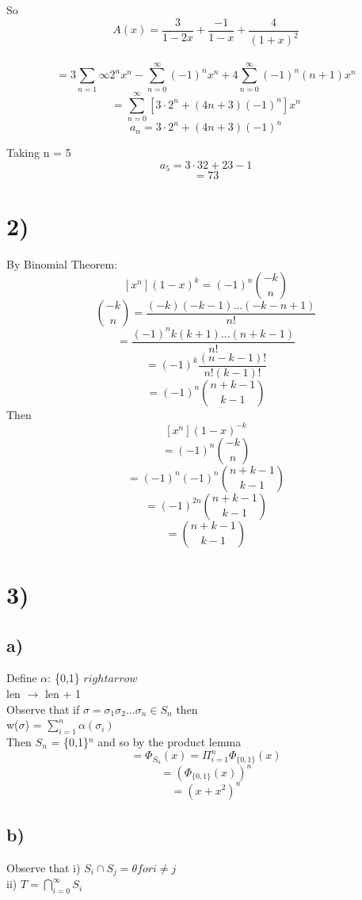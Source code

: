 \documentclass[12pt]{article}
\begin{document}
	So
	$$A(x) = \frac{3}{1-2x} + \frac{-1}{1-x} + \frac{4}{(1+x)^2}$$\\
	$$= 3 \sum_{n=1}{\infty}2^nx^n - \sum_{n=0}^{\infty}(-1)^nx^n + 4 \sum_{n=0}^{\infty}(-1)^n(n+1)x^n$$
	$$= \sum_{n=0}^{\infty}[3 \cdot 2^n + (4n+3)(-1)^n]x^n$$
	$$a_n = 3 \cdot 2^n + (4n+3)(-1)^n$$
	
	Taking n = 5\\
	
	$$a_5 = 3 \cdot 32 + 23 - 1$$
	$$ = 73$$
	
	\section*{2)}
	
	By Binomial Theorem:\\
	$$[x^n](1-x)^k = (-1)^n{-k \choose n}$$
	$${-k \choose n} = \frac{(-k)(-k-1)...(-k-n+1)}{n!}$$
	$$= \frac{(-1)^nk(k+1)...(n+k-1)}{n!}$$
	$$= (-1)^k\frac{(n-k-1)!}{n!(k-1)!}$$
	$$= (-1)^n{n+k-1 \choose k-1}$$
	Then
	$$[x^n](1-x)^{-k}$$
	$$= (-1)^n{-k \choose n}$$
	$$= (-1)^n(-1)^n{n+k-1 \choose k-1}$$
	$$= (-1)^{2n}{n+k-1 \choose k-1}$$
	$$= {n+k-1 \choose k-1}$$
	
	\section*{3)}
	
	\subsection*{a)}
	Define $\alpha$: \{0,1\} $rightarrow$\\
	len $\rightarrow$ len + 1\\
	
	Observe that if $\sigma = \sigma_1 \sigma_2 ... \sigma_n \in S_n$ then\\
	w($\sigma$) = $\sum_{i=1}^{n}\alpha(\sigma_i)$\\
	
	Then $S_n$ = \{0,1\}$^n$ and so by the product lemma\\
	$$= \Phi_{S_n}(x) = \Pi_{i=1}^{n}\Phi_{\{0,1\}}(x)$$
	$$=(\Phi_{\{0,1\}}(x))^n$$
	$$=(x+x^2)^n$$
	
	\subsection*{b)}
	
	Observe that i) $S_i \cap S_j = \theta for i \neq j$\\
	ii) $T = \bigcap_{i=0}^{\infty}S_i$\\
	
\end{document}
